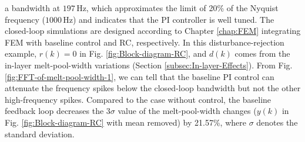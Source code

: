 \documentclass [11pt, proquest] {uwthesis}[2020/02/24]
\begin{document}
a bandwidth at $197\,\text{Hz}$, which approximates the limit of
20\% of the Nyquist frequency ($1000\,\text{Hz}$) and indicates that
the PI controller is well tuned. The closed-loop simulations are designed
according to Chapter \ref{chap:FEM} integrating
FEM with baseline control and RC, respectively. In this disturbance-rejection
example, $r(k)=0$ in Fig. \ref{fig:Block-diagram-RC}, and $d(k)$
comes from the in-layer melt-pool-width variations (Section \ref{subsec:In-layer-Effects}).
From Fig. \ref{fig:FFT-of-melt-pool-width-1}, we can tell that the
baseline PI control can attenuate the frequency spikes below the closed-loop
bandwidth but not the other high-frequency spikes. Compared to the
case without control, the baseline feedback loop decreases the $3\sigma$
value of the melt-pool-width changes ($y(k)$ in Fig. \ref{fig:Block-diagram-RC}
with mean removed) by 21.57\%, where $\sigma$ denotes the standard
deviation.
\end{document}
